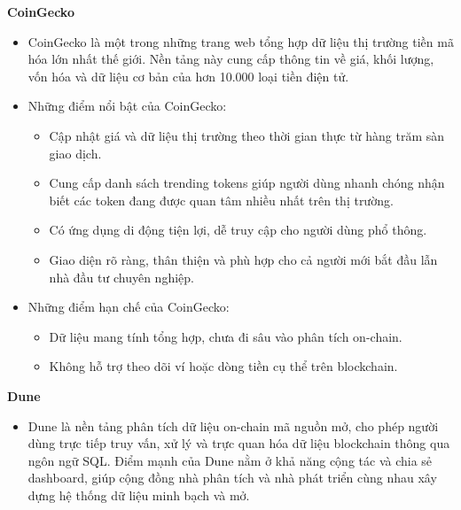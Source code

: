 \documentclass{article}[14pt]
\begin{document}
{    \textbf{CoinGecko} \cite{coingecko}

    \begin{itemize}
        \item CoinGecko là một trong những trang web tổng hợp dữ liệu thị trường tiền mã hóa lớn nhất thế giới. Nền tảng này cung cấp thông tin về giá, khối lượng, vốn hóa và dữ liệu cơ bản của hơn 10.000 loại tiền điện tử.

        \item Những điểm nổi bật của CoinGecko:
        \begin{itemize}
            \item Cập nhật giá và dữ liệu thị trường theo thời gian thực từ hàng trăm sàn giao dịch.
            \item Cung cấp danh sách trending tokens giúp người dùng nhanh chóng nhận biết các token đang được quan tâm nhiều nhất trên thị trường.
            \item Có ứng dụng di động tiện lợi, dễ truy cập cho người dùng phổ thông.
            \item Giao diện rõ ràng, thân thiện và phù hợp cho cả người mới bắt đầu lẫn nhà đầu tư chuyên nghiệp.
        \end{itemize}
    \end{itemize}

    \begin{itemize}
        \item Những điểm hạn chế của CoinGecko:
        \begin{itemize}
            \item Dữ liệu mang tính tổng hợp, chưa đi sâu vào phân tích on-chain.
            \item Không hỗ trợ theo dõi ví hoặc dòng tiền cụ thể trên blockchain.
        \end{itemize}
    \end{itemize}

    \textbf{Dune} \cite{dune}
    
    \begin{itemize}
        \item Dune là nền tảng phân tích dữ liệu on-chain mã nguồn mở, cho phép người dùng trực tiếp truy vấn, xử lý và trực quan hóa dữ liệu blockchain thông qua ngôn ngữ SQL. Điểm mạnh của Dune nằm ở khả năng cộng tác và chia sẻ dashboard, giúp cộng đồng nhà phân tích và nhà phát triển cùng nhau xây dựng hệ thống dữ liệu minh bạch và mở.
    

\end{itemize}}
\end{document}
